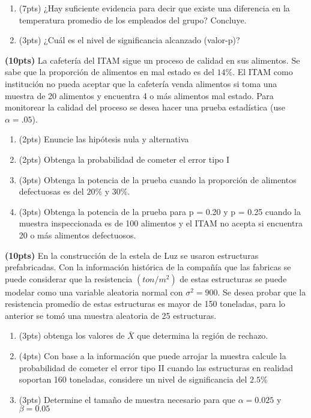 \documentclass[addpoints]{exam}
\theoremstyle{mytheor}
\begin{document}
\begin{questions}
\begin{enumerate}[label=\Alph*)]
  \item (7pts) ¿Hay suficiente evidencia para decir que existe una diferencia en la temperatura promedio de los empleados del grupo? Concluye.
  \item (3pts) ¿Cuál es el nivel de significancia alcanzado (valor-p)?
  \end{enumerate}
  
  \question \textbf{(10pts)} La cafetería del ITAM sigue un proceso de calidad en sus alimentos. Se sabe que la proporción de alimentos en mal estado es del $14\%$. El ITAM como institución no pueda aceptar que la cafetería venda alimentos si toma una muestra de 20 alimentos y encuentra 4 o más alimentos mal estado. Para monitorear la calidad del proceso se desea hacer una prueba estadística (use $\alpha = .05$). 
  
  \begin{enumerate}[label=\Alph*)]
  \item (2pts) Enuncie las hipótesis nula y alternativa
  \item (2pts) Obtenga la probabilidad de cometer el error tipo I 
  \item (3pts) Obtenga la potencia de la prueba cuando la proporción de alimentos defectuosas es del $20\%$ y $30\%$. 
  \item (3pts) Obtenga la potencia de la prueba para p = 0.20 y p = 0.25 cuando la muestra inspeccionada es de 100 alimentos y el ITAM no acepta si encuentra 20 o más alimentos defectuosos.
  \end{enumerate}
 
  
  \question \textbf{(10pts)} En la construcción de la estela de Luz se usaron estructuras prefabricadas. Con la información histórica de la compañía que las fabricas se puede considerar que la resistencia $(ton/m^2)$ de estas estructuras se puede modelar como una variable aleatoria normal con $\sigma^2 = 900$. Se desea probar que la resistencia promedio de estas estructuras es mayor de 150 toneladas, para lo anterior se tomó una muestra aleatoria de 25 estructuras. 
  \begin{enumerate}[label=\Alph*)]
  \item (3pts) obtenga los valores de $\bar{X}$ que determina la región de rechazo. 
  \item (4pts) Con base a la información que puede arrojar la muestra calcule la probabilidad de cometer el error tipo II cuando las estructuras en realidad soportan 160 toneladas, considere un nivel de significancia del $2.5\%$
  \item (3pts) Determine el tamaño de muestra necesario para que $\alpha = 0.025$ y $\beta = 0.05$
  \end{enumerate}

  \end{questions}
  
\end{document}

